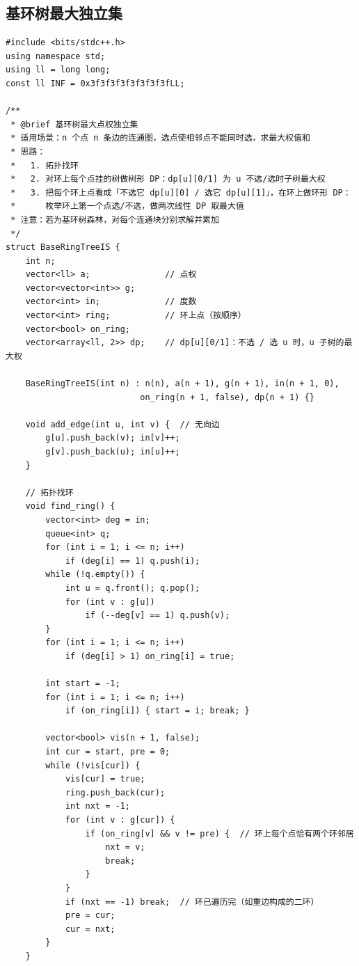 \subsection{基环树最大独立集}

\begin{lstlisting}
#include <bits/stdc++.h>
using namespace std;
using ll = long long;
const ll INF = 0x3f3f3f3f3f3f3f3fLL;

/**
 * @brief 基环树最大点权独立集
 * 适用场景：n 个点 n 条边的连通图，选点使相邻点不能同时选，求最大权值和
 * 思路：
 *   1. 拓扑找环
 *   2. 对环上每个点挂的树做树形 DP：dp[u][0/1] 为 u 不选/选时子树最大权
 *   3. 把每个环上点看成「不选它 dp[u][0] / 选它 dp[u][1]」，在环上做环形 DP：
 *      枚举环上第一个点选/不选，做两次线性 DP 取最大值
 * 注意：若为基环树森林，对每个连通块分别求解并累加
 */
struct BaseRingTreeIS {
    int n;
    vector<ll> a;               // 点权
    vector<vector<int>> g;
    vector<int> in;             // 度数
    vector<int> ring;           // 环上点（按顺序）
    vector<bool> on_ring;
    vector<array<ll, 2>> dp;    // dp[u][0/1]：不选 / 选 u 时，u 子树的最大权

    BaseRingTreeIS(int n) : n(n), a(n + 1), g(n + 1), in(n + 1, 0),
                           on_ring(n + 1, false), dp(n + 1) {}

    void add_edge(int u, int v) {  // 无向边
        g[u].push_back(v); in[v]++;
        g[v].push_back(u); in[u]++;
    }

    // 拓扑找环
    void find_ring() {
        vector<int> deg = in;
        queue<int> q;
        for (int i = 1; i <= n; i++)
            if (deg[i] == 1) q.push(i);
        while (!q.empty()) {
            int u = q.front(); q.pop();
            for (int v : g[u])
                if (--deg[v] == 1) q.push(v);
        }
        for (int i = 1; i <= n; i++)
            if (deg[i] > 1) on_ring[i] = true;

        int start = -1;
        for (int i = 1; i <= n; i++)
            if (on_ring[i]) { start = i; break; }

        vector<bool> vis(n + 1, false);
        int cur = start, pre = 0;
        while (!vis[cur]) {
            vis[cur] = true;
            ring.push_back(cur);
            int nxt = -1;
            for (int v : g[cur]) {
                if (on_ring[v] && v != pre) {  // 环上每个点恰有两个环邻居
                    nxt = v;
                    break;
                }
            }
            if (nxt == -1) break;  // 环已遍历完（如重边构成的二环）
            pre = cur;
            cur = nxt;
        }
    }


\end{lstlisting}
